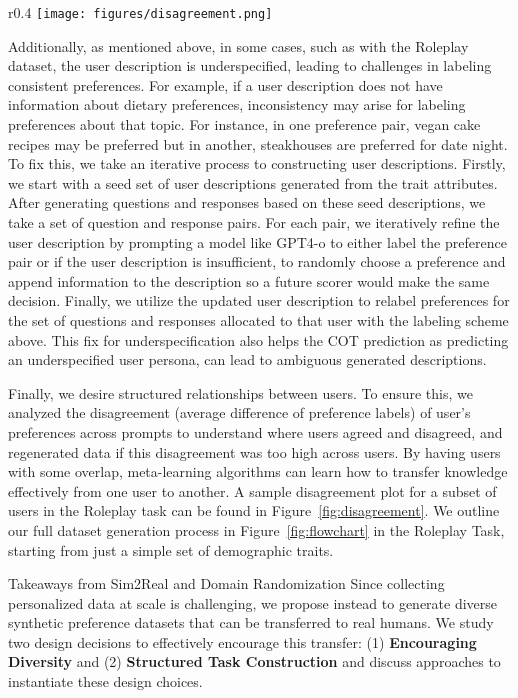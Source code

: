 \begin{wrapfigure}{r}{0.4\textwidth} %
    \centering
    \texttt{[image: figures/disagreement.png]}
    \vspace{-0.4cm}
    \caption{\footnotesize\textbf{Disagreement Matrix across 5 users in Roleplay.} Here we plot the disagreement of preferences for 5 users. There is a mix of users with high and low disagreement.}
    \label{fig:disagreement}
    \vspace{-0.2cm}
\end{wrapfigure}
Additionally, as mentioned above, in some cases, such as with the Roleplay dataset, the user description is underspecified, leading to challenges in labeling consistent preferences. For example, if a user description does not have information about dietary preferences, inconsistency may arise for labeling preferences about that topic. For instance, in one preference pair, vegan cake recipes may be preferred but in another, steakhouses are preferred for date night. To fix this, we take an iterative process to constructing user descriptions. Firstly, we start with a seed set of user descriptions generated from the trait attributes. After generating questions and responses based on these seed descriptions, we take a set of question and response pairs. For each pair, we iteratively refine the user description by prompting a model like GPT4-o to either label the preference pair or if the user description is insufficient, to randomly choose a preference and append information to the description so a future scorer would make the same decision. Finally, we utilize the updated user description to relabel preferences for the set of questions and responses allocated to that user with the labeling scheme above. This fix for underspecification also helps the COT prediction as predicting an underspecified user persona, can lead to ambiguous generated descriptions.

Finally, we desire structured relationships between users. To ensure this, we analyzed the disagreement (average difference of preference labels) of user's preferences across prompts to understand where users agreed and disagreed, and regenerated data if this disagreement was too high across users. By having users with some overlap, meta-learning algorithms can learn how to transfer knowledge effectively from one user to another. A sample disagreement plot for a subset of users in the Roleplay task can be found in Figure~\ref{fig:disagreement}. We outline our full dataset generation process in Figure~\ref{fig:flowchart} in the Roleplay Task, starting from just a simple set of demographic traits.

\begin{AIbox}{Takeaways from Sim2Real and Domain Randomization}
Since collecting personalized data at scale is challenging, we propose instead to generate diverse synthetic preference datasets that can be transferred to real humans. We study two design decisions to effectively encourage this transfer: (1) \textbf{Encouraging Diversity} and (2) \textbf{Structured Task Construction} and discuss approaches to instantiate these design choices.
\end{AIbox}